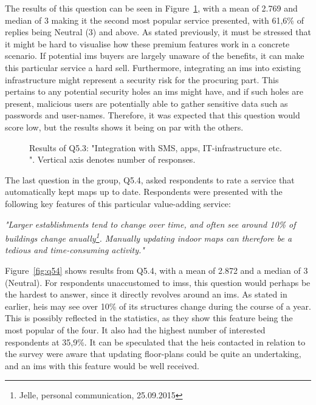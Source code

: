 The results of this question can be seen in Figure~\ref{fig:q53}, with a mean of 2.769 and median of 3 making it the second most popular service presented, with 61,6\% of replies being Neutral (3) and above. As stated previously, it must be stressed that it might be hard to visualise how these premium features work in a concrete scenario. If potential \gls{ims} buyers are largely unaware of the benefits, it can make this particular service a hard sell. Furthermore, integrating an \gls{ims} into existing infrastructure might represent a security risk for the procuring part. This pertains to any potential security holes an \gls{ims} might have, and if such holes are present, malicious users are potentially able to gather sensitive data such as passwords and user-names. Therefore, it was expected that this question would score low, but the results shows it being on par with the others.  

\begin{figure}[H]
    \centering
    \caption{Results of Q5.3: "Integration with SMS, apps, IT-infrastructure etc.
". Vertical axis denotes number of responses.}
    \label{fig:q53}
\end{figure}

The last question in the group, Q5.4, asked respondents to rate a service that automatically kept maps up to date. Respondents were presented with the following key features of this particular value-adding service:

\begin{displayquote}
\textit{"Larger establishments tend to change over time, and often see around 10\% of buildings change anually\footnote{Jelle, personal communication, 25.09.2015}. Manually updating indoor maps can therefore be a tedious and time-consuming activity."}
\end{displayquote}

Figure~\ref{fig:q54} shows results from Q5.4, with a mean of 2.872 and a median of 3 (Neutral). For respondents unaccustomed to \glspl{ims}, this question would perhaps be the hardest to answer, since it directly revolves around an \gls{ims}. As stated in earlier, \glspl{hei} may see over 10\% of its structures change during the course of a year. This is possibly reflected in the statistics, as they show this feature being the most popular of the four. It also had the highest number of interested respondents at 35,9\%. It can be speculated that the \glspl{hei} contacted in relation to the survey were aware that updating floor-plans could be quite an undertaking, and an \gls{ims} with this feature would be well received. 


